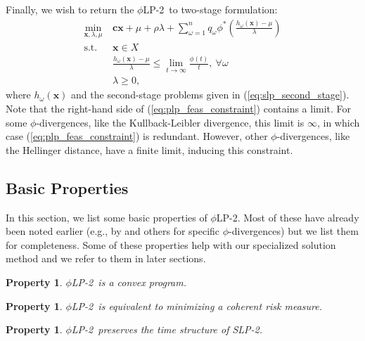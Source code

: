 \documentclass[ijoc,letterpaper]{informs3} %
\newcommand{\x}{\mathbf{x}}
\renewcommand{\c}{\mathbf{c}}
\newtheorem{property}[theorem]{Property}
\newcommand{\st}{\mbox{s.t.}}
\newcommand{\plp}{$\phi$LP-2}
\begin{document}
Finally, we wish to return the \plp\ to two-stage formulation:
\begin{align}
	\min_{\x,\lambda,\mu} \ & \c\x + \mu + \rho \lambda + \sum_{\omega=1}^{n} q_\omega \phi^*\left(\frac{h_\omega(\x) - \mu}{\lambda}\right) \label{eq:plp_two_stage} \\
	\st \ & \x \in X \nonumber \\
	& \frac{h_\omega(\x) - \mu}{\lambda} \leq \lim_{t \rightarrow \infty} \frac{\phi(t)}{t}, \ \forall \omega \label{eq:plp_feas_constraint}\\
	& \lambda \geq 0, \nonumber
\end{align}
where $h_\omega(\x)$ and the second-stage problems given in (\ref{eq:slp_second_stage}).
Note that the right-hand side of (\ref{eq:plp_feas_constraint}) contains a limit.
For some $\phi$-divergences, like the Kullback-Leibler divergence, this limit is $\infty$, in which case (\ref{eq:plp_feas_constraint}) is redundant.
However, other $\phi$-divergences, like the Hellinger distance, have a finite limit, inducing this constraint.

\subsection{Basic Properties}
\label{ssec:basicprop}

In this section, we list some basic properties of \plp.
Most of these have already been noted earlier (e.g., by \cite{bental2011robust} and others for specific $\phi$-divergences) but we list them for completeness.
Some of these properties help with our specialized solution method and we refer to them in later sections.

\begin{property}
	\label{property:convex}
	\plp\ is a convex program.
\end{property}

\begin{property}
	\label{property:coherent_risk_measure}
	\plp\ is equivalent to minimizing a coherent risk measure.
\end{property}

\begin{property}
	\label{property:time_structure}
	\plp\ preserves the time structure of SLP-2.
\end{property}
\end{document}
